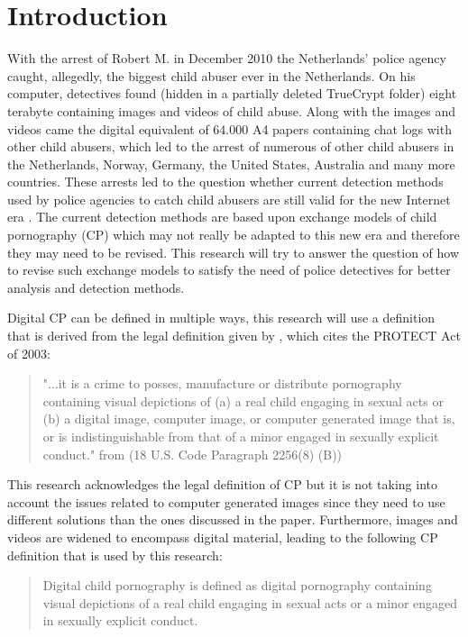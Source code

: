 \documentclass{sig-alternate-br}
\begin{document}
\section{Introduction}
With the arrest of Robert M. in December 2010 \cite{site:bbc} the Netherlands' police agency caught, allegedly, the biggest child abuser ever in the Netherlands. On his computer, detectives found (hidden in a partially deleted TrueCrypt folder) eight terabyte containing images and videos of child abuse. Along with the images and videos came the digital equivalent of 64.000 A4 papers containing chat logs with other child abusers, which led to the arrest of numerous of other child abusers in the Netherlands, Norway, Germany, the United States, Australia and many more countries. These arrests led to the question whether current detection methods used by police agencies to catch child abusers are still valid for the new Internet era \cite{wijk2009achter}. The current detection methods are based upon exchange models of child pornography (CP) which may not really be adapted to this new era and therefore they may need to be revised. This research will try to answer the question of how to revise such exchange models to satisfy the need of police detectives for better analysis and detection methods. 

Digital CP can be defined in multiple ways, this research will use a definition that is derived from the legal definition given by \cite{beech2008internet}, which cites the PROTECT Act of 2003:
\begin{quote}
	"...it is a crime to posses, manufacture or distribute pornography containing visual depictions of (a) a real child engaging in sexual acts or (b) a digital image, computer image, or computer generated image that is, or is indistinguishable from that of a minor engaged in sexually explicit conduct." from (18 U.S. Code Paragraph 2256(8) (B))
\end{quote}
This research acknowledges the legal definition of CP but it is not taking into account the issues related to computer generated images since they need to use different solutions than the ones discussed in the paper. Furthermore, images and videos are widened to encompass digital material, leading to the following CP definition that is used by this research:
\begin{quote} 
	Digital child pornography is defined as digital pornography containing visual depictions of a real child engaging in sexual acts or a minor engaged in sexually explicit conduct. 
\end{quote}
\end{document}
